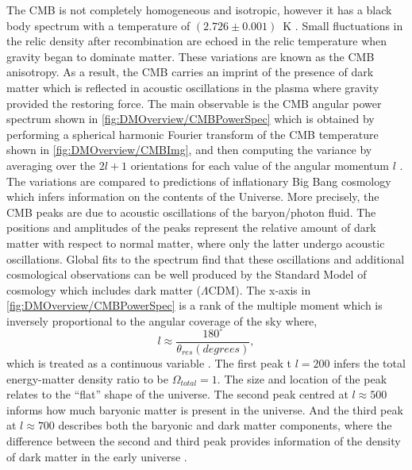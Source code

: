 The CMB is not completely homogeneous and isotropic, however it has a black body spectrum with a temperature of $(2.726\pm0.001)$~K \cite{Fixsen_2009}. Small fluctuations in the relic density after recombination are echoed in the relic temperature when gravity began to dominate matter. These variations are known as the CMB anisotropy. As a result, the CMB carries an imprint of the presence of dark matter which is reflected in acoustic oscillations in the plasma where gravity provided the restoring force. The main observable is the CMB angular power spectrum shown in \autoref{fig:DMOverview/CMBPowerSpec} which is obtained by performing a spherical harmonic Fourier transform of the CMB temperature shown in \autoref{fig:DMOverview/CMBImg}, and then computing the variance by averaging over the $2l+1$ orientations for each value of the angular momentum $l$ \cite{Cirelli:2024ssz}. The variations are compared to predictions of inflationary Big Bang cosmology which infers information on the contents of the Universe. More precisely, the CMB peaks are due to acoustic oscillations of the baryon/photon fluid. The positions and amplitudes of the peaks represent the relative amount of dark matter with respect to normal matter, where only the latter undergo acoustic oscillations. Global fits to the spectrum find that these oscillations and additional cosmological observations can be well produced by the Standard Model of cosmology which includes dark matter ($\Lambda \text{CDM}$). The x-axis in \autoref{fig:DMOverview/CMBPowerSpec} is a rank of the multiple moment which is inversely proportional to the angular coverage of the sky where,
\begin{equation}
    l \approx\frac{180^{\circ}}{\theta_{res}(degrees)},
\end{equation}
which is treated as a continuous variable \cite{Young2016}. The first peak t $l=200$ infers the total energy-matter density ratio to be $\Omega_{total}=1$. The size and location of the peak relates to the ``flat'' shape of the universe. The second peak centred at $l\approx500$ informs how much baryonic matter is present in the universe. And the third peak at $l\approx700$ describes both the baryonic and dark matter components, where the difference between the second and third peak provides information of the density of dark matter in the early universe \cite{Young2016}.
